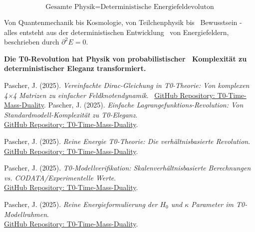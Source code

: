 \documentclass[12pt,a4paper]{article}
\newcommand{\Efield}{E}
\begin{document}
			\begin{equation}
				\boxed{\text{Gesamte Physik} = \text{Deterministische Energiefeldevoluton}}
			\end{equation}
			
			Von Quantenmechanik bis Kosmologie, von Teilchenphysik bis \
			Bewusstsein - alles entsteht aus der deterministischen Entwicklung \
			von Energiefeldern, beschrieben durch $\partial^2 \Efield = 0$.
			
			\textbf{Die T0-Revolution hat Physik von probabilistischer \
				Komplexität zu deterministischer Eleganz transformiert.}
			
			\begin{thebibliography}{99}
				\bibitem{pascher_simplified_dirac_2025}
				Pascher, J. (2025). \textit{Vereinfachte Dirac-Gleichung in T0-Theorie: Von komplexen 4×4 Matrizen zu einfacher Feldknotendynamik}. \
				\href{https://github.com/jpascher/T0-Time-Mass-Duality/blob/main/2/pdf/diracVereinfachtEn.pdf}{GitHub Repository: T0-Time-Mass-Duality}.
				Pascher, J. (2025). \textit{Einfache Lagrangefunktions-Revolution: Von Standardmodell-Komplexität zu T0-Eleganz}. \\
				\href{https://github.com/jpascher/T0-Time-Mass-Duality/blob/main/2/pdf/LagrandianVergleichEn.pdf}{GitHub Repository: T0-Time-Mass-Duality}.
				
				Pascher, J. (2025). \textit{Reine Energie T0-Theorie: Die verhältnisbasierte Revolution}. \\
				\href{https://github.com/jpascher/T0-Time-Mass-Duality/blob/main/2/pdf/Elimination_Of_Mass_Dirac_LagEn.pdf}{GitHub Repository: T0-Time-Mass-Duality}.
				
				Pascher, J. (2025). \textit{T0-Modellverifikation: Skalenverhältnisbasierte Berechnungen vs. CODATA/Experimentelle Werte}. \\
				\href{https://github.com/jpascher/T0-Time-Mass-Duality/blob/main/2/pdf/Elimination_Of_Mass_Dirac_TabelleEn.pdf}{GitHub Repository: T0-Time-Mass-Duality}.
				
				Pascher, J. (2025). \textit{Reine Energieformulierung der $H_0$ und $\kappa$ Parameter im T0-Modellrahmen}. \\
				\href{https://github.com/jpascher/T0-Time-Mass-Duality/blob/main/2/pdf/Ho_EnergieEn.pdf}{GitHub Repository: T0-Time-Mass-Duality}.
				

\end{thebibliography}
\end{document}
